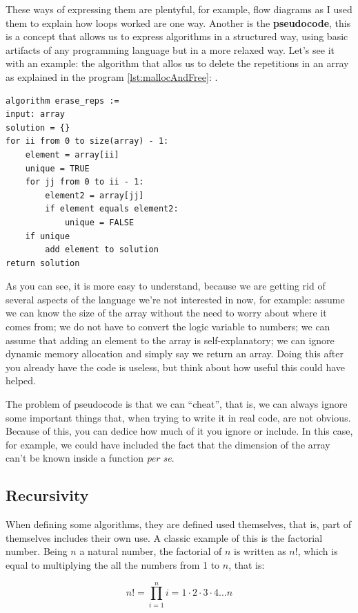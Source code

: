 \documentclass[a4paper]{article}
\begin{document}
These ways of expressing them are plentyful, for example, flow diagrams
as I used them to explain how loops worked are one way. Another is the
\textbf{pseudocode}, this is a concept that allows us to express algorithms
in a structured way, using basic artifacts of any programming language but in a
more relaxed way. Let's see it with an example: the algorithm that allos us to
delete the repetitions in an array as explained in the program
\ref{lst:mallocAndFree}: .

\begin{lstlisting}[style=pseudoCode]
algorithm erase_reps :=
input: array
solution = {}
for ii from 0 to size(array) - 1:
    element = array[ii]
    unique = TRUE
    for jj from 0 to ii - 1:
        element2 = array[jj]
        if element equals element2:
            unique = FALSE
    if unique
        add element to solution
return solution
\end{lstlisting}

As you can see, it is more easy to understand, because we are getting rid of
several aspects of the language we're not interested in now, for example:
assume we can know the size of the array without the need to worry about where
it comes from; we do not have to convert the logic variable to numbers; we
can assume that adding an element to the array is self-explanatory; we can
ignore dynamic memory allocation and simply say we return an array. Doing this
after you already have the code is useless, but think about how useful this
could have helped.

The problem of pseudocode is that we can ``cheat'', that is, we can always
ignore some important things that, when trying to write it in real code,
are not obvious. Because of this, you can dedice how much of it you ignore or
include. In this case, for example, we could have included the fact that the
dimension of the array can't be known inside a function \textit{per se}.

\subsection{Recursivity}
When defining some algorithms, they are defined used themselves, that is, part
of themselves includes their own use. A classic example of this is the factorial
number. Being $n$ a natural number, the factorial of $n$ is written as $n!$,
which is equal to multiplying the all the numbers from 1 to $n$, that is:

$$
n! = \prod^{n}_{i=1}{i}= 1\!\cdot\!2\!\cdot\!3\!\cdot\!4\dots{}n
$$
\end{document}

